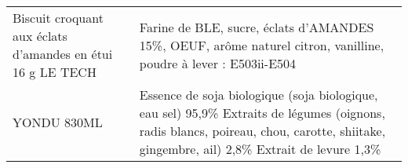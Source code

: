\begin{longtable}{p{5cm}p{10cm}}
                                               Biscuit croquant aux éclats d'amandes en étui 16 g LE TECH &                                                                                                                                                                                                                                                                                                                                                                                                                                                                                                                                                                                                                                                                                                                                                                                                                                                                                                                          Farine de BLE, sucre, éclats d'AMANDES 15\%, OEUF, arôme naturel citron, vanilline, poudre à lever : E503ii-E504 \\
                                                                                             YONDU 830ML  &                                                                                                                                                                                                                                                                                                                                                                                                                                                                                                                                                                                                                                                                                                                                                                                                                                                    Essence de soja biologique (soja biologique, eau sel) 95,9\% Extraits de légumes (oignons, radis blancs, poireau, chou, carotte, shiitake, gingembre, ail) 2,8\% Extrait de levure 1,3\% \\

\end{longtable}
